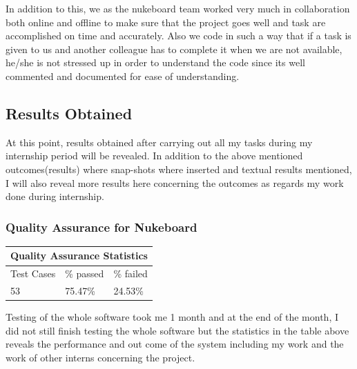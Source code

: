 In addition to this, we as the nukeboard team worked very much in collaboration both online and offline to make sure that the project goes well and task are accomplished on time and accurately. Also we code in such a way that if a task is given to us and another colleague has to complete it when we are not available, he/she is not stressed up in order to understand the code since its well commented and documented for ease of understanding.

\subsection{Results Obtained}

At this point, results obtained after carrying out all my tasks during my internship period will be revealed. In addition to the above mentioned outcomes(results) where snap-shots where inserted and textual results mentioned, I will also reveal more results here concerning the outcomes as regards my work done during internship.

\subsubsection{Quality Assurance for Nukeboard}

\begin{tabular}{ |p{3cm}|p{3cm}|p{3cm}|  }
 \hline
 \multicolumn{3}{|c|}{Quality Assurance Statistics} \\
 \hline
 Test Cases & \% passed & \% failed \\
 \hline
 53  & 75.47\% & 24.53\% \\
 \hline
\end{tabular}

Testing of the whole software took me 1 month and at the end of the month, I did not still finish testing the whole software but the statistics in the table above reveals the performance and out come of the system including my work and the work of other interns concerning the project. 